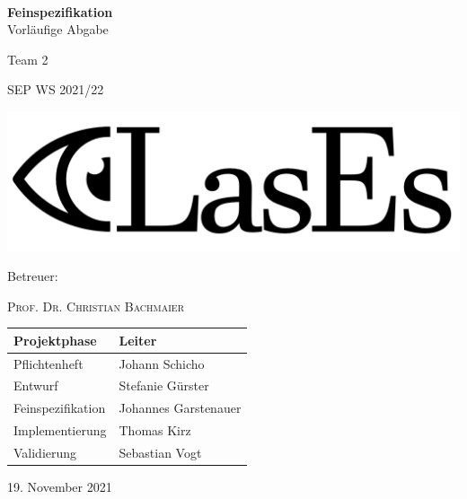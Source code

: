 \documentclass[a4paper,11pt]{article}
\begin{document}
    \begin{titlepage}
        \centering

        $~$

        \vspace{0.2cm} %

        \Huge \textbf{Feinspezifikation}\\
        \normalsize Vorläufige Abgabe\vspace{0.5cm}

        \Huge Team 2
        \Large

        SEP WS 2021/22

        \vspace{2cm}

        \includegraphics[width=0.8\linewidth]{graphics/LasEs-logo}

        \vspace{2cm}

        Betreuer:

        \textsc{Prof. Dr. Christian Bachmaier}

        \vspace{1cm}

        \begin{table}[H]
            \centering
            \Large
            \begin{tabular}{ll}
                \toprule
                \textbf{Projektphase} & \textbf{Leiter} \\
                \midrule
                Pflichtenheft & Johann Schicho \\
                Entwurf & Stefanie Gürster \\
                Feinspezifikation & Johannes Garstenauer \\
                Implementierung & Thomas Kirz \\
                Validierung & Sebastian Vogt \\
                \bottomrule
            \end{tabular}
        \end{table}

        \vspace{1cm}

        19. November 2021

    \end{titlepage}
\end{document}
